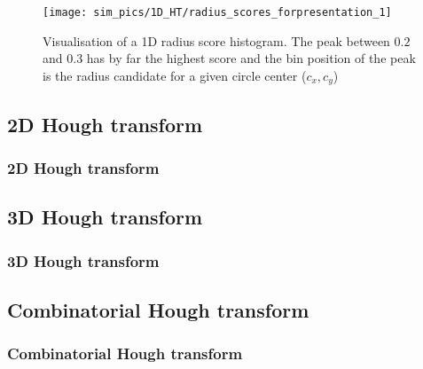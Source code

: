 \documentclass[10pt, xcolor={table}]{beamer}
\begin{document}
\begin{frame}[c,allowframebreaks]
\begin{figure}[ht]
\begin{tikzpicture}[scale=0.4]
  \end{tikzpicture}
  \label{fig:gauss}
\end{figure}
\framebreak

\begin{figure}[tb]
  \centering
  \texttt{[image: sim\_pics/1D\_HT/radius\_scores\_forpresentation\_1]}
  \caption[Graph visualisation of a 1D radius histogram]{Visualisation of a 1D radius score histogram. The peak between $0.2$ 
  and $0.3$ has by far the highest score and the bin
  position of the peak is the radius candidate for a given circle center ($c_x, c_y$)}
  \label{fig:1d_ht_radius_score}
\end{figure}
\end{frame}


\subsection{2D Hough transform} %
\label{sub:2d_hough_transform}

\begin{frame}[c]\frametitle{2D Hough transform}
    


\end{frame}


\subsection{3D Hough transform} %
\label{sub:3d_hough_transform}

\begin{frame}[c]\frametitle{3D Hough transform}
    


\end{frame}


\subsection{Combinatorial Hough transform} %
\label{sub:combinatorial_hough_transform}

\begin{frame}[c]\frametitle{Combinatorial Hough transform}
    


\end{frame}
\end{document}

